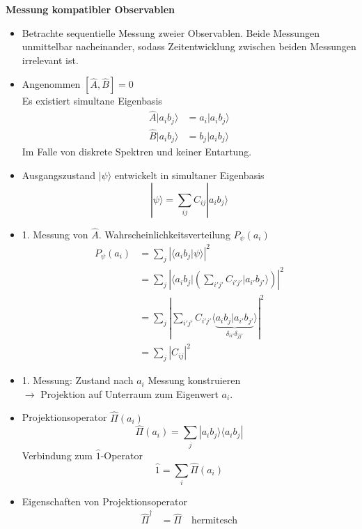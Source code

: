 \documentclass[10pt,article,colorback,accentcolor=tud9d]{scrartcl}
\begin{document}
\textbf{Messung kompatibler Observablen}
\begin{itemize}
	\item Betrachte sequentielle Messung zweier Observablen. Beide Messungen unmittelbar nacheinander, sodass Zeitentwicklung zwischen beiden Messungen irrelevant ist.
  \item Angenommen $\left[\hat{A},\hat{B}\right]=0$\\
    Es existiert simultane Eigenbasis
    \begin{align}
      \hat{A}|a_ib_j\rangle&=a_i|a_ib_j\rangle\\
      \hat{B}|a_ib_j\rangle&=b_j|a_ib_j\rangle
    \end{align}
    Im Falle von diskrete Spektren und keiner Entartung.
  \item Ausgangszustand $|\psi\rangle$ entwickelt in simultaner Eigenbasis
    \begin{equation}
    |\psi\rangle=\sum_{ij}C_{ij}|a_ib_j\rangle
    \end{equation}
  \item 1. Messung von $\hat{A}$. Wahrscheinlichkeitsverteilung $P_\psi(a_i)$
    \begin{align}
      P_\psi(a_i)&=\sum_j\left|\langle a_ib_j|\psi\rangle\right|^2\\
      &=\sum_j\left|\langle a_ib_j|\left(\sum_{i'j'}C_{i'j'}|a_{i'}b_{j'}\rangle\right)\right|^2\\
      &=\sum_j\left|\sum_{i'j'}C_{i'j'}\langle\underbrace{a_ib_j|a_{i'}b_{j'}}_{\delta_{ii'}\delta_{jj'}}\rangle\right|^2\\
      &=\sum_j\left|C_{ij}\right|^2
    \end{align}
  \item 1. Messung: Zustand nach $a_i$ Messung konstruieren\\
    $\rightarrow$ Projektion auf Unterraum zum Eigenwert $a_i$.
  \item Projektionsoperator $\hat{\Pi}(a_i)$
    \begin{equation}
      \hat{\Pi}(a_i)=\sum_j|a_ib_j\rangle\langle a_ib_j|
    \end{equation}
    Verbindung zum $\hat{1}$-Operator 
    \begin{equation}
    \hat{1}=\sum_i\hat{\Pi}(a_i)
    \end{equation}
  \item Eigenschaften von Projektionsoperator 
    \begin{align}
      \hat{\Pi}^\dagger&=\hat{\Pi} \quad \text{hermitesch}\\

\end{align}
\end{itemize}
\end{document}
